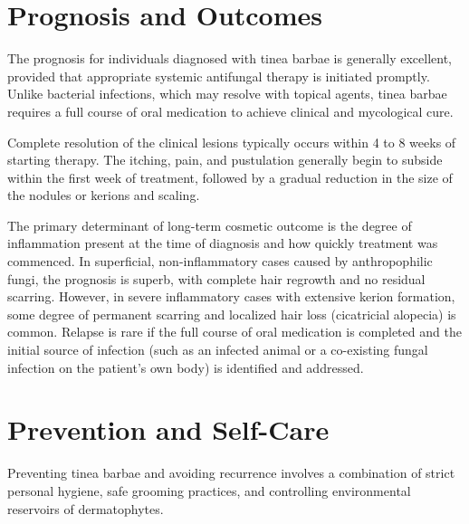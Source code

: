 \section*{Prognosis and Outcomes}
The prognosis for individuals diagnosed with tinea barbae is generally excellent, provided that appropriate systemic antifungal therapy is initiated promptly. Unlike bacterial infections, which may resolve with topical agents, tinea barbae requires a full course of oral medication to achieve clinical and mycological cure.

Complete resolution of the clinical lesions typically occurs within 4 to 8 weeks of starting therapy. The itching, pain, and pustulation generally begin to subside within the first week of treatment, followed by a gradual reduction in the size of the nodules or kerions and scaling.

The primary determinant of long-term cosmetic outcome is the degree of inflammation present at the time of diagnosis and how quickly treatment was commenced. In superficial, non-inflammatory cases caused by anthropophilic fungi, the prognosis is superb, with complete hair regrowth and no residual scarring. However, in severe inflammatory cases with extensive kerion formation, some degree of permanent scarring and localized hair loss (cicatricial alopecia) is common. Relapse is rare if the full course of oral medication is completed and the initial source of infection (such as an infected animal or a co-existing fungal infection on the patient's own body) is identified and addressed.

\section*{Prevention and Self-Care}
Preventing tinea barbae and avoiding recurrence involves a combination of strict personal hygiene, safe grooming practices, and controlling environmental reservoirs of dermatophytes.

